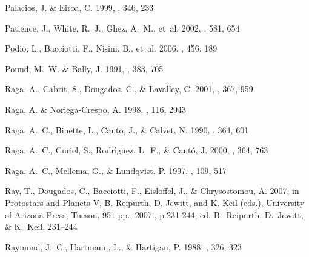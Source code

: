 \documentclass{aa}
\begin{document}
\begin{thebibliography}{80}
{Palacios}, J. \& {Eiroa}, C. 1999, \aap, 346, 233

{Patience}, J., {White}, R.~J., {Ghez}, A.~M., {et~al.} 2002, \apj, 581, 654

{Podio}, L., {Bacciotti}, F., {Nisini}, B., {et~al.} 2006, \aap, 456, 189

{Pound}, M.~W. \& {Bally}, J. 1991, \apj, 383, 705

{Raga}, A., {Cabrit}, S., {Dougados}, C., \& {Lavalley}, C. 2001, \aap, 367,
  959

{Raga}, A. \& {Noriega-Crespo}, A. 1998, \aj, 116, 2943

{Raga}, A.~C., {Binette}, L., {Canto}, J., \& {Calvet}, N. 1990, \apj, 364, 601

{Raga}, A.~C., {Curiel}, S., {Rodr{\'{\i}}guez}, L.~F., \& {Cant{\' o}}, J.
  2000, \aap, 364, 763

{Raga}, A.~C., {Mellema}, G., \& {Lundqvist}, P. 1997, \apjs, 109, 517

{Ray}, T., {Dougados}, C., {Bacciotti}, F., {Eisl{\"o}ffel}, J., \&
  {Chrysostomou}, A. 2007, in Protostars and Planets V, B. Reipurth, D. Jewitt,
  and K. Keil (eds.), University of Arizona Press, Tucson, 951 pp., 2007.,
  p.231-244, ed. B.~{Reipurth}, D.~{Jewitt}, \& K.~{Keil}, 231--244

{Raymond}, J.~C., {Hartmann}, L., \& {Hartigan}, P. 1988, \apj, 326, 323


\end{thebibliography}
\end{document}
